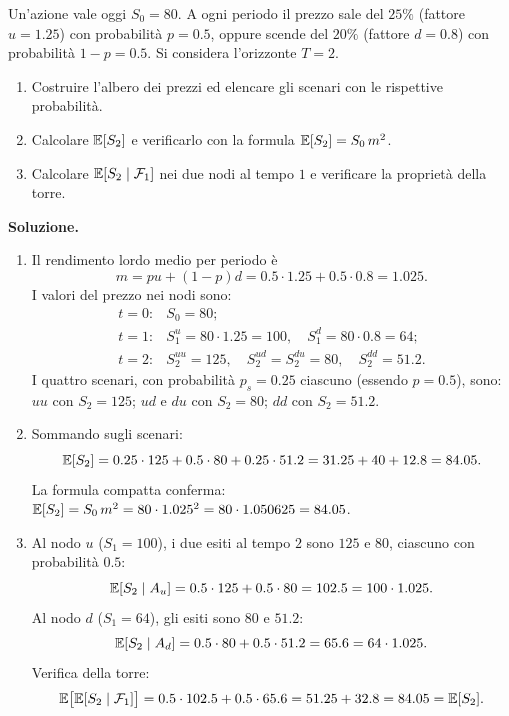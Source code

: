 \begin{exercise}
\label{ex:binomiale}
Un'azione vale oggi $S_0=80$. A ogni periodo il prezzo sale del
$25\%$ (fattore $u=1.25$) con probabilit\`{a} $p=0.5$, oppure scende
del $20\%$ (fattore $d=0.8$) con probabilit\`{a} $1-p=0.5$. Si
considera l'orizzonte $T=2$.
\begin{enumerate}
\item Costruire l'albero dei prezzi ed elencare gli scenari con le
rispettive probabilit\`{a}.
\item Calcolare $\mathbb{E}[S_2]$ e verificarlo con la formula
$\mathbb{E}[S_2]=S_0\,m^2$.
\item Calcolare $\mathbb{E}[S_2\mid\mathcal{F}_1]$ nei due nodi al tempo $1$ e
verificare la propriet\`{a} della torre.
\end{enumerate}
\end{exercise}

\noindent
\textbf{Soluzione.}
\begin{enumerate}

\item Il rendimento lordo medio per periodo \`{e}
\[
m=pu+(1-p)d=0.5\cdot 1.25+0.5\cdot 0.8=1.025.
\]
I valori del prezzo nei nodi sono:
\[
\begin{array}{ll}
t=0: & S_0=80;\\
t=1: & S_1^u=80\cdot 1.25=100, \quad S_1^d=80\cdot 0.8=64;\\
t=2: & S_2^{uu}=125, \quad S_2^{ud}=S_2^{du}=80,
       \quad S_2^{dd}=51.2.
\end{array}
\]
I quattro scenari, con probabilit\`{a} $p_s=0.25$ ciascuno (essendo
$p=0.5$), sono: $uu$ con $S_2=125$; $ud$ e $du$ con $S_2=80$; $dd$ con
$S_2=51.2$.

\item Sommando sugli scenari:
\[
\mathbb{E}[S_2]=0.25\cdot 125+0.5\cdot 80+0.25\cdot 51.2
=31.25+40+12.8=84.05.
\]
La formula compatta conferma: $\mathbb{E}[S_2]=S_0\,m^2=80\cdot
1.025^2=80\cdot 1.050625=84.05$.

\item Al nodo $u$ ($S_1=100$), i due esiti al tempo $2$ sono $125$ e
$80$, ciascuno con probabilit\`{a} $0.5$:
\[
\mathbb{E}[S_2\mid A_u]=0.5\cdot 125+0.5\cdot 80=102.5=100\cdot 1.025.
\]
Al nodo $d$ ($S_1=64$), gli esiti sono $80$ e $51.2$:
\[
\mathbb{E}[S_2\mid A_d]=0.5\cdot 80+0.5\cdot 51.2=65.6=64\cdot 1.025.
\]
Verifica della torre:
\[
\mathbb{E}\bigl[\mathbb{E}[S_2\mid\mathcal{F}_1]\bigr]
=0.5\cdot 102.5+0.5\cdot 65.6=51.25+32.8=84.05=\mathbb{E}[S_2].
\]
\end{enumerate}

